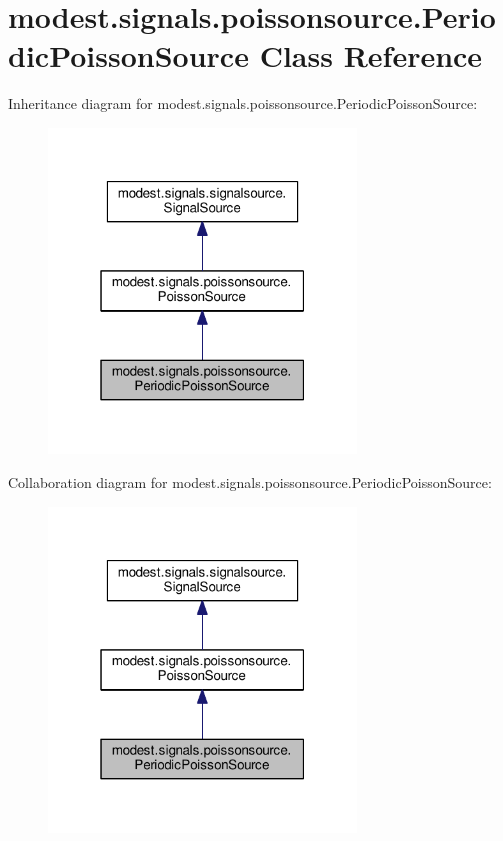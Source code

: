 \hypertarget{classmodest_1_1signals_1_1poissonsource_1_1PeriodicPoissonSource}{}\section{modest.\+signals.\+poissonsource.\+Periodic\+Poisson\+Source Class Reference}
\label{classmodest_1_1signals_1_1poissonsource_1_1PeriodicPoissonSource}


Inheritance diagram for modest.\+signals.\+poissonsource.\+Periodic\+Poisson\+Source\+:
\nopagebreak
\begin{figure}[H]
\begin{center}
\leavevmode
\includegraphics[width=232pt]{classmodest_1_1signals_1_1poissonsource_1_1PeriodicPoissonSource__inherit__graph}
\end{center}
\end{figure}


Collaboration diagram for modest.\+signals.\+poissonsource.\+Periodic\+Poisson\+Source\+:
\nopagebreak
\begin{figure}[H]
\begin{center}
\leavevmode
\includegraphics[width=232pt]{classmodest_1_1signals_1_1poissonsource_1_1PeriodicPoissonSource__coll__graph}
\end{center}
\end{figure}

